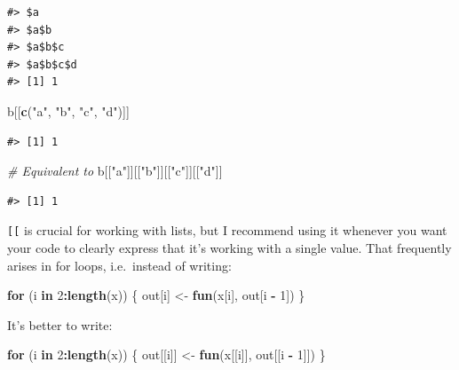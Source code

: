 \documentclass[]{book}
\newenvironment{Shaded}{\begin{snugshade}}{\end{snugshade}}
\newcommand{\KeywordTok}[1]{\textcolor[rgb]{0.13,0.29,0.53}{\textbf{#1}}}
\newcommand{\DecValTok}[1]{\textcolor[rgb]{0.00,0.00,0.81}{#1}}
\newcommand{\StringTok}[1]{\textcolor[rgb]{0.31,0.60,0.02}{#1}}
\newcommand{\CommentTok}[1]{\textcolor[rgb]{0.56,0.35,0.01}{\textit{#1}}}
\newcommand{\ControlFlowTok}[1]{\textcolor[rgb]{0.13,0.29,0.53}{\textbf{#1}}}
\newcommand{\OperatorTok}[1]{\textcolor[rgb]{0.81,0.36,0.00}{\textbf{#1}}}
\newcommand{\NormalTok}[1]{#1}
\theoremstyle{definition}
\theoremstyle{definition}
\theoremstyle{definition}
\theoremstyle{remark}
\begin{document}
\begin{verbatim}
#> $a
#> $a$b
#> $a$b$c
#> $a$b$c$d
#> [1] 1
\end{verbatim}

\begin{Shaded}
\begin{Highlighting}[]
\NormalTok{b[[}\KeywordTok{c}\NormalTok{(}\StringTok{"a"}\NormalTok{, }\StringTok{"b"}\NormalTok{, }\StringTok{"c"}\NormalTok{, }\StringTok{"d"}\NormalTok{)]]}
\end{Highlighting}
\end{Shaded}

\begin{verbatim}
#> [1] 1
\end{verbatim}

\begin{Shaded}
\begin{Highlighting}[]
\CommentTok{# Equivalent to}
\NormalTok{b[[}\StringTok{"a"}\NormalTok{]][[}\StringTok{"b"}\NormalTok{]][[}\StringTok{"c"}\NormalTok{]][[}\StringTok{"d"}\NormalTok{]]}
\end{Highlighting}
\end{Shaded}

\begin{verbatim}
#> [1] 1
\end{verbatim}

\texttt{{[}{[}} is crucial for working with lists, but I recommend using
it whenever you want your code to clearly express that it's working with
a single value. That frequently arises in for loops, i.e.~instead of
writing:

\begin{Shaded}
\begin{Highlighting}[]
\ControlFlowTok{for}\NormalTok{ (i }\ControlFlowTok{in} \DecValTok{2}\OperatorTok{:}\KeywordTok{length}\NormalTok{(x)) \{}
\NormalTok{  out[i] <-}\StringTok{ }\KeywordTok{fun}\NormalTok{(x[i], out[i }\OperatorTok{-}\StringTok{ }\DecValTok{1}\NormalTok{])}
\NormalTok{\}}
\end{Highlighting}
\end{Shaded}

It's better to write:

\begin{Shaded}
\begin{Highlighting}[]
\ControlFlowTok{for}\NormalTok{ (i }\ControlFlowTok{in} \DecValTok{2}\OperatorTok{:}\KeywordTok{length}\NormalTok{(x)) \{}
\NormalTok{  out[[i]] <-}\StringTok{ }\KeywordTok{fun}\NormalTok{(x[[i]], out[[i }\OperatorTok{-}\StringTok{ }\DecValTok{1}\NormalTok{]])}
\NormalTok{\}}
\end{Highlighting}
\end{Shaded}
\end{document}
